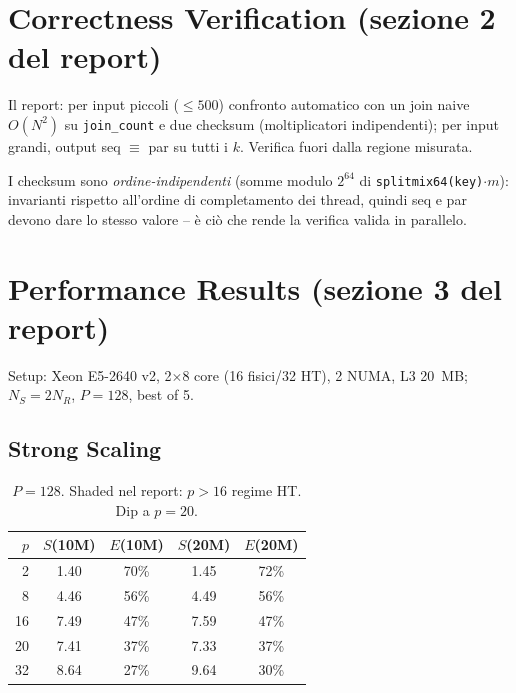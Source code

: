 \documentclass[11pt,a4paper]{article}
\begin{document}
\section{Correctness Verification (sezione 2 del report)}

Il report: per input piccoli ($\le500$) confronto automatico con un join naive $O(N^2)$ su \texttt{join\_count} e due checksum (moltiplicatori indipendenti); per input grandi, output seq $\equiv$ par su tutti i $k$. Verifica fuori dalla regione misurata.

\begin{difesa}
I checksum sono \emph{ordine-indipendenti} (somme modulo $2^{64}$ di \texttt{splitmix64(key)$\cdot m$}): invarianti rispetto all'ordine di completamento dei thread, quindi seq e par devono dare lo stesso valore -- è ciò che rende la verifica valida in parallelo.
\end{difesa}

\section{Performance Results (sezione 3 del report)}

Setup: Xeon E5-2640 v2, 2$\times$8 core (16 fisici/32 HT), 2 NUMA, L3 20~MB; $N_S=2N_R$, $P=128$, best of 5.

\subsection{Strong Scaling}

\begin{table}[H]\centering\small
\begin{tabular}{@{}rcccc@{}}\toprule
$p$ & $S$(10M) & $E$(10M) & $S$(20M) & $E$(20M) \\\midrule
2 & 1.40 & 70\% & 1.45 & 72\% \\ 8 & 4.46 & 56\% & 4.49 & 56\% \\
16 & 7.49 & 47\% & 7.59 & 47\% \\ 20 & 7.41 & 37\% & 7.33 & 37\% \\ 32 & 8.64 & 27\% & 9.64 & 30\% \\\bottomrule
\end{tabular}\caption{$P=128$. Shaded nel report: $p>16$ regime HT. Dip a $p=20$.}
\end{table}
\end{document}
